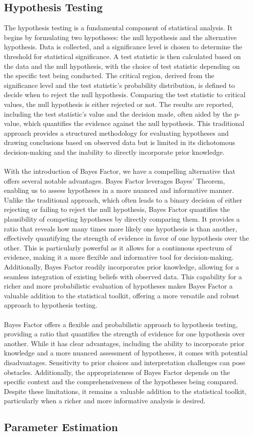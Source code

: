 \documentclass{article}
\begin{document}
\subsection{Hypothesis Testing}
The hypothesis testing is a fundamental component of statistical analysis. It begins by formulating two hypotheses: the null hypothesis and the alternative hypothesis. Data is collected, and a significance level is chosen to determine the threshold for statistical significance. A test statistic is then calculated based on the data and the null hypothesis, with the choice of test statistic depending on the specific test being conducted. The critical region, derived from the significance level and the test statistic's probability distribution, is defined to decide when to reject the null hypothesis. Comparing the test statistic to critical values, the null hypothesis is either rejected or not. The results are reported, including the test statistic's value and the decision made, often aided by the p-value, which quantifies the evidence against the null hypothesis. This traditional approach provides a structured methodology for evaluating hypotheses and drawing conclusions based on observed data but is limited in its dichotomous decision-making and the inability to directly incorporate prior knowledge.\\\\
With the introduction of Bayes Factor, we have a compelling alternative that offers several notable advantages. Bayes Factor leverages Bayes' Theorem, enabling us to assess hypotheses in a more nuanced and informative manner. Unlike the traditional approach, which often leads to a binary decision of either rejecting or failing to reject the null hypothesis, Bayes Factor quantifies the plausibility of competing hypotheses by directly comparing them. It provides a ratio that reveals how many times more likely one hypothesis is than another, effectively quantifying the strength of evidence in favor of one hypothesis over the other. This is particularly powerful as it allows for a continuous spectrum of evidence, making it a more flexible and informative tool for decision-making. Additionally, Bayes Factor readily incorporates prior knowledge, allowing for a seamless integration of existing beliefs with observed data. This capability for a richer and more probabilistic evaluation of hypotheses makes Bayes Factor a valuable addition to the statistical toolkit, offering a more versatile and robust approach to hypothesis testing.\\\\
Bayes Factor offers a flexible and probabilistic approach to hypothesis testing, providing a ratio that quantifies the strength of evidence for one hypothesis over another. While it has clear advantages, including the ability to incorporate prior knowledge and a more nuanced assessment of hypotheses, it comes with potential disadvantages. Sensitivity to prior choices and interpretation challenges can pose obstacles. Additionally, the appropriateness of Bayes Factor depends on the specific context and the comprehensiveness of the hypotheses being compared. Despite these limitations, it remains a valuable addition to the statistical toolkit, particularly when a richer and more informative analysis is desired.
\subsection{Parameter Estimation}
\end{document}

